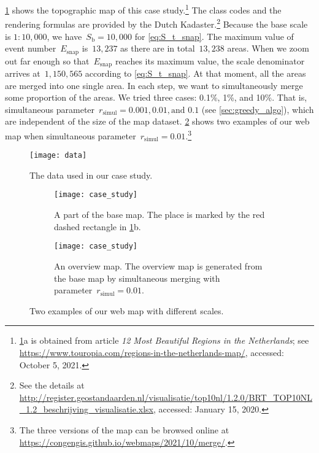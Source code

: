 \documentclass[twocolumn]{svjour3}          %
\begin{document}
%
\fig\ref{fig:data} shows the topographic map of this case study.\footnote{%
    \fig\ref{fig:data}a is obtained from article 
    \emph{12 Most Beautiful Regions in the Netherlands}; see
    \url{https://www.touropia.com/regions-in-the-netherlands-map/},
    accessed: October 5, 2021.}
The class codes and the rendering formulas are provided by the Dutch Kadaster.\footnote{%
See the details at
\url{http://register.geostandaarden.nl/visualisatie/top10nl/1.2.0/BRT_TOP10NL_1.2_beschrijving_visualisatie.xlsx},
accessed: January 15, 2020.}
%
Because the base scale is $1:10{,}000$, 
we have~$S_\mathrm{b} = 10{,}000$ for \eq\ref{eq:S_t_snap}.
The maximum value of event number~$E_\mathrm{snap}$ is~$13{,}237$
as there are in total~$13{,}238$ areas.
When we zoom out far enough 
so that~$E_\mathrm{snap}$ reaches its maximum value,
the scale denominator arrives at~$1{,}150{,}565$
according to \eq\ref{eq:S_t_snap}.
At that moment, all the areas are merged into one single area.
In each step, we want to simultaneously merge some proportion of the areas.
We tried three cases: 0.1\%, 1\%, and 10\%.
That is, simultaneous parameter~$r_\mathrm{simul}=0.001, 0.01, \text{and~} 0.1$ 
(see \sect\ref{sec:greedy_algo}), 
which are independent of the size of the map dataset.
\fig\ref{fig:web_map} shows two examples of our web map when 
simultaneous parameter~$r_\mathrm{simul}=0.01$.\footnote{%
The three versions of the map can be browsed online at
\url{https://congengis.github.io/webmaps/2021/10/merge/}.}


\begin{figure}[tb]
\centering
\texttt{[image: data]}
\caption{
    The data used in our case study.}
\label{fig:data}
\end{figure}


\begin{figure}[tb]
\centering
\begin{subfigure}[t]{0.49\textwidth}
\centering
\texttt{[image: case\_study]}
\caption{A part of the base map. The place is marked 
    by the red dashed rectangle in \fig\ref{fig:data}b.}
\end{subfigure}
\newline
\vspace{0.5cm}
%
\begin{subfigure}[t]{0.49\textwidth}
\centering
\texttt{[image: case\_study]}
\caption{An overview map.
   The overview map is generated from the base map 
    by simultaneous merging with parameter~$r_\mathrm{simul}= 0.01$.}
\end{subfigure}
\caption{Two examples of our web map with different scales.
    }
\label{fig:web_map}
\end{figure}
\end{document}
